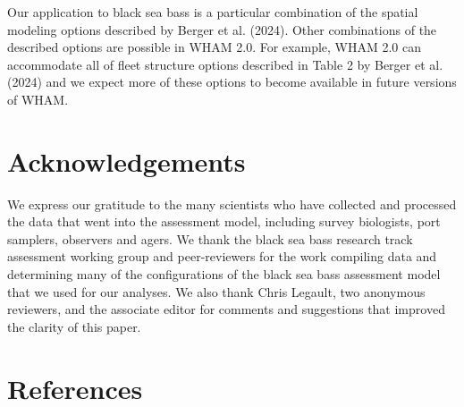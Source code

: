 \documentclass[
]{article}
\begin{document}
Our application to black sea bass is a particular combination of the spatial modeling options described by Berger et al. (2024). Other combinations of the described options are possible in WHAM 2.0. For example, WHAM 2.0 can accommodate all of fleet structure options described in Table 2 by Berger et al. (2024) and we expect more of these options to become available in future versions of WHAM.

\hypertarget{acknowledgements}{%
\section*{Acknowledgements}\label{acknowledgements}}

We express our gratitude to the many scientists who have collected and processed the data that went into the assessment model, including survey biologists, port samplers, observers and agers. We thank the black sea bass research track assessment working group and peer-reviewers for the work compiling data and determining many of the configurations of the black sea bass assessment model that we used for our analyses. We also thank Chris Legault, two anonymous reviewers, and the associate editor for comments and suggestions that improved the clarity of this paper.

\hypertarget{references}{%
\section*{References}\label{references}}
\end{document}
